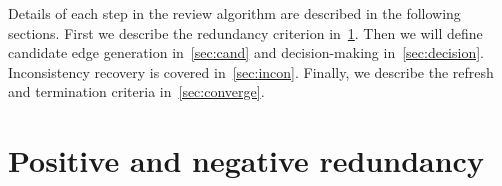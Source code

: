 Details of each step in the review algorithm are described in the following sections.
First we describe the redundancy criterion in~\cref{sec:redun}.
Then we will define candidate edge generation in~\cref{sec:cand} and decision-making in~\cref{sec:decision}.
Inconsistency recovery is covered in~\cref{sec:incon}.
Finally, we describe the refresh and termination criteria in~\cref{sec:converge}.


\FloatBarrier{}
\section{Positive and negative redundancy}\label{sec:redun}

